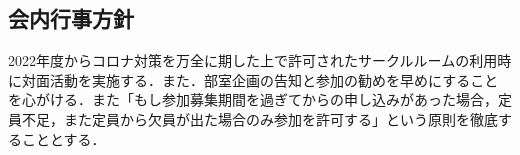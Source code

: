 \subsection*{会内行事方針}

2022年度からコロナ対策を万全に期した上で許可されたサークルルームの利用時に対面活動を実施する．また．部室企画の告知と参加の勧めを早めにすることを心がける．また「もし参加募集期間を過ぎてからの申し込みがあった場合，定員不足，また定員から欠員が出た場合のみ参加を許可する」という原則を徹底することとする．
